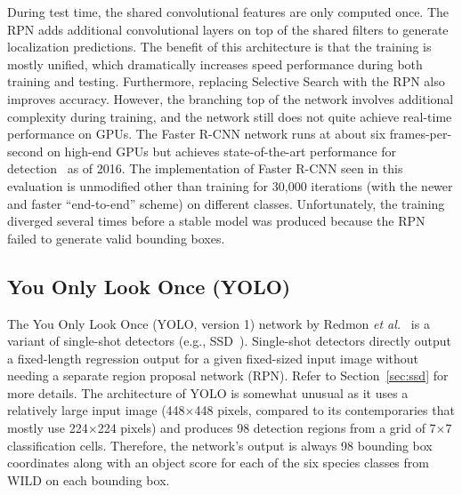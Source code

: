 During test time, the shared convolutional features are only computed once.  The RPN adds additional convolutional layers on top of the shared filters to generate localization predictions.  The benefit of this architecture is that the training is mostly unified, which dramatically increases speed performance during both training and testing.  Furthermore, replacing Selective Search with the RPN also improves accuracy.  However, the branching top of the network involves additional complexity during training, and the network still does not quite achieve real-time performance on GPUs.  The Faster R-CNN network runs at about six frames-per-second on high-end GPUs but achieves state-of-the-art performance for detection~\cite{russakovsky_imagenet_2015} as of 2016.  The implementation of Faster R-CNN seen in this evaluation is unmodified other than training for 30,000 iterations (with the newer and faster ``end-to-end'' scheme) on different classes. Unfortunately, the training diverged several times before a stable model was produced because the RPN failed to generate valid bounding boxes.

\subsection{You Only Look Once (YOLO)}

The You Only Look Once (YOLO, version 1) network by Redmon \textit{et al.}~\cite{redmon_you_2016} is a variant of single-shot detectors (e.g., SSD~\cite{liu_ssd:_2016}).  Single-shot detectors directly output a fixed-length regression output for a given fixed-sized input image without needing a separate region proposal network (RPN).  Refer to Section~\ref{sec:ssd} for more details.  The architecture of YOLO is somewhat unusual as it uses a relatively large input image (448$\times$448 pixels, compared to its contemporaries that mostly use 224$\times$224 pixels) and produces 98 detection regions from a grid of 7$\times$7 classification cells.  Therefore, the network's output is always 98 bounding box coordinates along with an object score for each of the six species classes from WILD on each bounding box.

